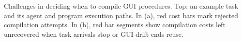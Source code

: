 \caption{Challenges in deciding when to compile GUI procedures.
Top: an example task and its agent and program execution paths.
In (a), red cost bars mark rejected compilation attempts.
In (b), red bar segments show compilation costs left unrecovered when task arrivals stop or GUI drift ends reuse.}
